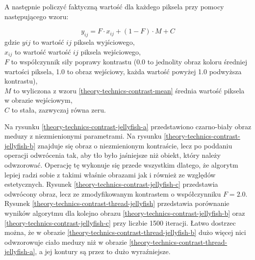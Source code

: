         A następnie policzyć faktyczną wartość dla każdego piksela przy pomocy następującego wzoru:
        
        \begin{equation} \label{theory-technics-contrast-equation}
            y_{ij} = F \cdot x_{ij} + (1-F) \cdot M + C
        \end{equation}
        gdzie \(y{ij}\) to wartość \(ij\) piksela wyjściowego, \\
        \(x_{ij}\) to wartość wartość \(ij\) piksela wejściowego, \\
        \(F\) to współczynnik siły poprawy kontrastu (0.0 to jednolity obraz koloru średniej wartości piksela, 1.0 to obraz wejściowy, każda wartość powyżej 1.0 podwyższa kontrastu),\\
        \(M\) to wyliczona z wzoru \eqref{theory-technics-contrast-mean} średnia wartość piksela w obrazie wejściowym,\\
        \(C\) to stała, zazwyczaj równa zeru.
        
        Na rysunku \ref{theory-technics-contrast-jellyfish-a} przedstawiono czarno-biały obraz meduzy z niezmienionymi parametrami. Na rysunku \ref{theory-technics-contrast-jellyfish-b} znajduje się obraz o niezmienionym kontraście, lecz po poddaniu operacji odwrócenia tak, aby tło było jaśniejsze niż obiekt, który należy odwzorować. Operację tę wykonuje się przede wszystkim dlatego, że algorytm lepiej radzi sobie z takimi właśnie obrazami jak i również ze względów estetycznych. Rysunek \ref{theory-technics-contrast-jellyfish-c} przedstawia odwrócony obraz, lecz ze zmodyfikowanym kontrastem o współczynniku \(F = 2.0\). Rysunek \ref{theory-technics-contrast-thread-jellyfish} przedstawia porównanie wyników algorytmu dla kolejno obrazu \ref{theory-technics-contrast-jellyfish-b} oraz \ref{theory-technics-contrast-jellyfish-c} przy liczbie 1500 iteracji. Łatwo dostrzec można, że w obrazie \ref{theory-technics-contrast-thread-jellyfish-b} dużo więcej nici odwzorowuje ciało meduzy niż w obrazie \ref{theory-technics-contrast-thread-jellyfish-a}, a jej kontury są przez to dużo wyraźniejsze.
        
